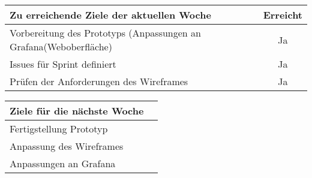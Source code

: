 \begin{tabularx}{\textwidth}{Xc}
    \arrayrulecolor{OliveGreen}
    \toprule
    {\bfseries Zu erreichende Ziele der aktuellen Woche} & {\bfseries Erreicht} \\
    \midrule[2pt]
    Vorbereitung des Prototyps (Anpassungen an Grafana(Weboberfläche)                               &Ja                    \\
    \rowcolor{OliveGreen!15}
    Issues für Sprint definiert                              &Ja                    \\
    \rowcolor{OliveGreen!15}
    Prüfen der Anforderungen des Wireframes &Ja \\
   \bottomrule[2pt]
\end{tabularx}
%
\vspace{1cm}
%
\begin{tabularx}{\textwidth}{Xc}
    \arrayrulecolor{OliveGreen}
    \toprule
    {\bfseries Ziele für die nächste Woche}              &                      \\
    \midrule[2pt]
    Fertigstellung Prototyp                                 &                      \\
    \rowcolor{OliveGreen!15}
    Anpassung des Wireframes & \\
    \rowcolor{OliveGreen!15}
    Anpassungen an Grafana & \\
\end{tabularx}
